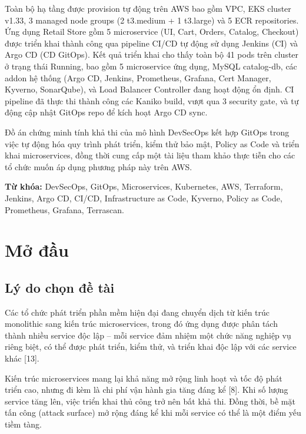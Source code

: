\documentclass[13pt,a4paper,twoside]{extarticle}
\begin{document}
Toàn bộ hạ tầng được provision tự động trên AWS bao gồm VPC, EKS cluster v1.33, 3 managed node groups (2 t3.medium + 1 t3.large) và 5 ECR repositories. Ứng dụng Retail Store gồm 5 microservice (UI, Cart, Orders, Catalog, Checkout) được triển khai thành công qua pipeline CI/CD tự động sử dụng Jenkins (CI) và Argo CD (CD GitOps). Kết quả triển khai cho thấy toàn bộ 41 pods trên cluster ở trạng thái Running, bao gồm 5 microservice ứng dụng, MySQL catalog-db, các addon hệ thống (Argo CD, Jenkins, Prometheus, Grafana, Cert Manager, Kyverno, SonarQube), và Load Balancer Controller đang hoạt động ổn định. CI pipeline đã thực thi thành công các Kaniko build, vượt qua 3 security gate, và tự động cập nhật GitOps repo để kích hoạt Argo CD sync.

Đồ án chứng minh tính khả thi của mô hình DevSecOps kết hợp GitOps trong việc tự động hóa quy trình phát triển, kiểm thử bảo mật, Policy as Code và triển khai microservices, đồng thời cung cấp một tài liệu tham khảo thực tiễn cho các tổ chức muốn áp dụng phương pháp này trên AWS.

\vspace{12pt}
\noindent\textbf{Từ khóa:} DevSecOps, GitOps, Microservices, Kubernetes, AWS, Terraform, Jenkins, Argo CD, CI/CD, Infrastructure as Code, Kyverno, Policy as Code, Prometheus, Grafana, Terrascan.

\newpage

\section{Mở đầu}

\subsection{Lý do chọn đề tài}

Các tổ chức phát triển phần mềm hiện đại đang chuyển dịch từ kiến trúc monolithic sang kiến trúc microservices, trong đó ứng dụng được phân tách thành nhiều service độc lập -- mỗi service đảm nhiệm một chức năng nghiệp vụ riêng biệt, có thể được phát triển, kiểm thử, và triển khai độc lập với các service khác [13].

Kiến trúc microservices mang lại khả năng mở rộng linh hoạt và tốc độ phát triển cao, nhưng đi kèm là chi phí vận hành gia tăng đáng kể [8]. Khi số lượng service tăng lên, việc triển khai thủ công trở nên bất khả thi. Đồng thời, bề mặt tấn công (attack surface) mở rộng đáng kể khi mỗi service có thể là một điểm yếu tiềm tàng.
\end{document}
